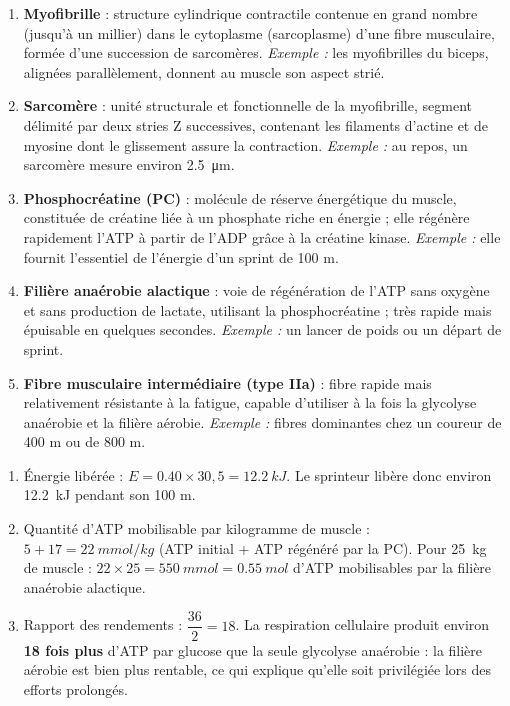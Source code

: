 \documentclass[11pt]{article}
\begin{document}
\begin{corrige}
\begin{enumerate}
\item \textbf{Myofibrille} : structure cylindrique contractile contenue en grand nombre (jusqu'à un millier) dans le cytoplasme (sarcoplasme) d'une fibre musculaire, formée d'une succession de sarcomères. \emph{Exemple :} les myofibrilles du biceps, alignées parallèlement, donnent au muscle son aspect strié.
\item \textbf{Sarcomère} : unité structurale et fonctionnelle de la myofibrille, segment délimité par deux stries Z successives, contenant les filaments d'actine et de myosine dont le glissement assure la contraction. \emph{Exemple :} au repos, un sarcomère mesure environ \SI{2,5}{\micro\meter}.
\item \textbf{Phosphocréatine (PC)} : molécule de réserve énergétique du muscle, constituée de créatine liée à un phosphate riche en énergie ; elle régénère rapidement l'ATP à partir de l'ADP grâce à la créatine kinase. \emph{Exemple :} elle fournit l'essentiel de l'énergie d'un sprint de 100 m.
\item \textbf{Filière anaérobie alactique} : voie de régénération de l'ATP sans oxygène et sans production de lactate, utilisant la phosphocréatine ; très rapide mais épuisable en quelques secondes. \emph{Exemple :} un lancer de poids ou un départ de sprint.
\item \textbf{Fibre musculaire intermédiaire (type IIa)} : fibre rapide mais relativement résistante à la fatigue, capable d'utiliser à la fois la glycolyse anaérobie et la filière aérobie. \emph{Exemple :} fibres dominantes chez un coureur de 400 m ou de 800 m.
\end{enumerate}
\end{corrige}

\begin{corrige}
\begin{enumerate}
\item Énergie libérée : $E = \num{0,40} \times 30,5 = \SI{12,2}{kJ}$. Le sprinteur libère donc environ \SI{12,2}{kJ} pendant son 100 m.
\item Quantité d'ATP mobilisable par kilogramme de muscle : $5 + 17 = \SI{22}{mmol/kg}$ (ATP initial + ATP régénéré par la PC). Pour \SI{25}{kg} de muscle : $22 \times 25 = \SI{550}{mmol} = \SI{0,55}{mol}$ d'ATP mobilisables par la filière anaérobie alactique.
\item Rapport des rendements : $\dfrac{36}{2} = 18$. La respiration cellulaire produit environ \textbf{18 fois plus} d'ATP par glucose que la seule glycolyse anaérobie : la filière aérobie est bien plus rentable, ce qui explique qu'elle soit privilégiée lors des efforts prolongés.
\end{enumerate}
\end{corrige}
\end{document}
